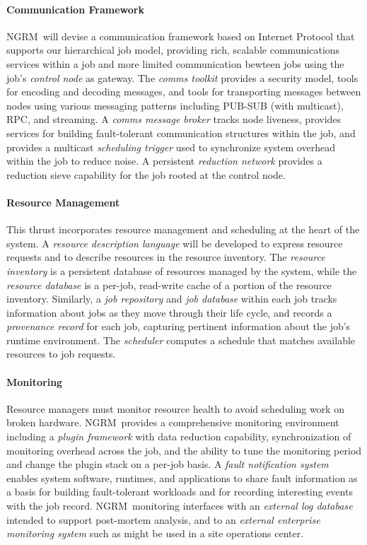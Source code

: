 \documentclass{article}
\newcommand{\ngrm}{NGRM}
\begin{document}
\paragraph{Communication Framework}
\ngrm\ will devise a communication framework based on Internet Protocol
that supports our hierarchical job model, providing rich, scalable
communications services
within a job and more limited communication bewteen jobs using
the job's {\em control node} as gateway.
The {\em comms toolkit} provides a security model, tools for
encoding and decoding messages, and tools for transporting messages between
nodes using various messaging patterns including PUB-SUB (with multicast),
RPC, and streaming.
A {\em comms message broker} tracks node liveness, provides services for
building fault-tolerant communication structures within the job,
and provides a multicast {\em scheduling trigger} used to synchronize
system overhead within the job to reduce noise.
A persistent {\em reduction network}
provides a reduction sieve capability for the job rooted at the control node.

\paragraph{Resource Management}
This thrust incorporates resource management and scheduling at the heart of 
the system.  A {\em resource description language} will be developed to
express resource requests and to describe resources in the resource inventory.
The {\em resource inventory} is a persistent database of resources managed
by the system, while the {\em resource database} is a per-job, read-write
cache of a portion of the resource inventory.
Similarly, a {\em job repository} and {\em job database} within each job
tracks information about jobs as they move through their life cycle,
and records a {\em provenance record} for each job, capturing pertinent
information about the job's runtime environment.
 The {\em scheduler} computes a schedule that matches available
resources to job requests.  

\paragraph{Monitoring}
Resource managers must monitor resource health to avoid scheduling
work on broken hardware.  \ngrm\ provides a comprehensive monitoring
environment including a {\em plugin framework} with data reduction
capability, synchronization of monitoring overhead across the job,
and the ability to tune the monitoring period and change the plugin
stack on a per-job basis.
A {\em fault notification system} enables system software, runtimes, and
applications to share fault information as a basis for building fault-tolerant
workloads and for recording interesting events with the job record.
\ngrm\ monitoring interfaces with an {\em external log database} intended
to support post-mortem analysis, and to
an {\em external enterprise monitoring system} such as might be used in
a site operations center.
\end{document}

